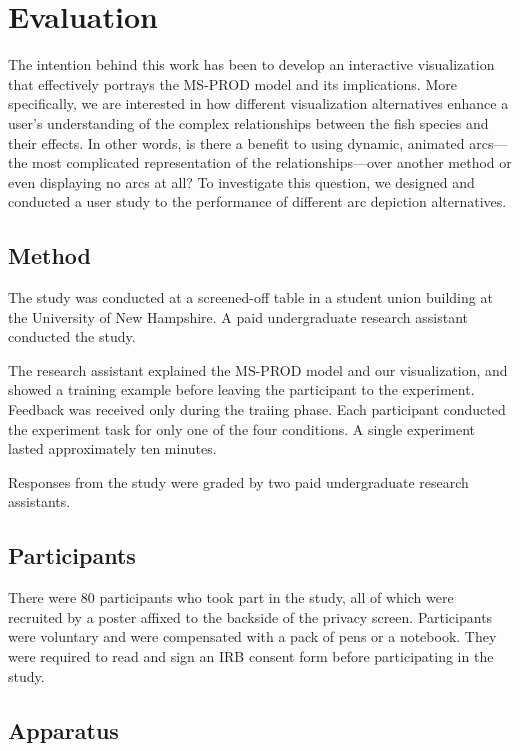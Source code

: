 \chapter{Evaluation}

The intention behind this work has been to develop an interactive visualization that effectively portrays the MS-PROD model and its implications.  More specifically, we are interested in how different visualization alternatives enhance a user's understanding of the complex relationships between the fish species and their effects.  In other words, is there a benefit to using dynamic, animated arcs---the most complicated representation of the relationships---over another method or even displaying no arcs at all?  To investigate this question, we designed and conducted a user study to the performance of different arc depiction alternatives.

\section{Method}

The study was conducted at a screened-off table in a student union building at the University of New Hampshire.  A paid undergraduate research assistant conducted the study.

The research assistant explained the MS-PROD model and our visualization, and showed a training example before leaving the participant to the experiment.  Feedback was received only during the traiing phase.  Each participant conducted the experiment task for only one of the four conditions.  A single experiment lasted approximately ten minutes.

Responses from the study were graded by two paid undergraduate research assistants.

\section{Participants}

There were 80 participants who took part in the study, all of which were recruited by a poster affixed to the backside of the privacy screen.  Participants were voluntary and were compensated with a pack of pens or a notebook.  They were required to read and sign an IRB consent form before participating in the study.

\section{Apparatus}

